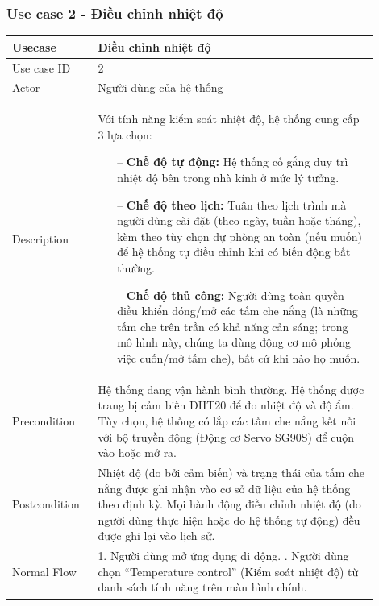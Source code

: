 \subsubsection{Use case 2 - Điều chỉnh nhiệt độ}
\renewcommand{\arraystretch}{1.6}
\begin{table}[H]
\centering
\begin{tabular}{|p{0.2\linewidth}|p{0.7\linewidth}|}
\hline
\rowcolor[HTML]{EFEFEF} 
\textbf{Usecase}        & \textbf{Điều chỉnh nhiệt độ} \\ \hline
Use case ID             & 2 \\ \hline
Actor                   & Người dùng của hệ thống \\ \hline
Description             & 
    Với tính năng kiểm soát nhiệt độ, hệ thống cung cấp 3 lựa chọn:
    \begin{itemize}
        \item [--] \textbf{Chế độ tự động:} Hệ thống cố gắng duy trì nhiệt độ bên trong nhà kính ở mức lý tưởng.
        \item [--] \textbf{Chế độ theo lịch:} Tuân theo lịch trình mà người dùng cài đặt (theo ngày, tuần hoặc tháng), kèm theo tùy chọn dự phòng an toàn (nếu muốn) để hệ thống tự điều chỉnh khi có biến động bất thường.
        \item [--] \textbf{Chế độ thủ công:} Người dùng toàn quyền điều khiển đóng/mở các tấm che nắng (là những tấm che trên trần có khả năng cản sáng; trong mô hình này, chúng ta dùng động cơ mô phỏng việc cuốn/mở tấm che), bất cứ khi nào họ muốn.
    \end{itemize}
\\ \hline
Precondition            & 
Hệ thống đang vận hành bình thường. \newline
Hệ thống được trang bị cảm biến DHT20 để đo nhiệt độ và độ ẩm. \newline
Tùy chọn, hệ thống có lắp các tấm che nắng kết nối với bộ truyền động (Động cơ Servo SG90S) để cuộn vào hoặc mở ra. 
\\ \hline
Postcondition           & 
Nhiệt độ (đo bởi cảm biến) và trạng thái của tấm che nắng được ghi nhận vào cơ sở dữ liệu của hệ thống theo định kỳ. \newline
Mọi hành động điều chỉnh nhiệt độ (do người dùng thực hiện hoặc do hệ thống tự động) đều được ghi lại vào lịch sử.
\\ \hline
Normal Flow             & 
1. Người dùng mở ứng dụng di động. \newline
2. Người dùng chọn “Temperature control” (Kiểm soát nhiệt độ) từ danh sách tính năng trên màn hình chính. \newline

\end{tabular}
\end{table}
